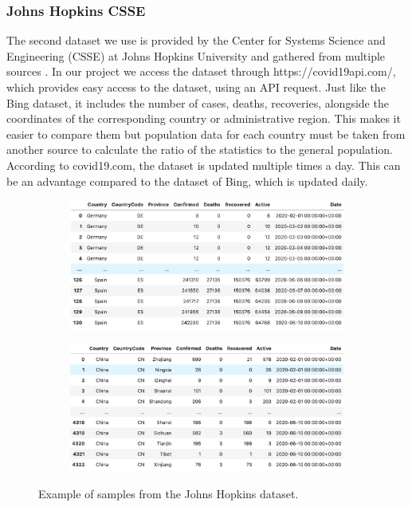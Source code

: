 \subsubsection{Johns Hopkins CSSE}
The second dataset we use is provided by the Center for Systems Science and Engineering (CSSE) at Johns Hopkins University and gathered from multiple sources \cite{JohnsHopkins}.
In our project we access the dataset through https://covid19api.com/, which provides easy access to the dataset, using an API request. Just like the Bing dataset, it includes the number of cases, deaths, recoveries, alongside the coordinates of the
corresponding country or administrative region. This makes it easier to compare them but population data for each country must be taken from another source to calculate the ratio of the statistics to the general population.
According to covid19.com, the dataset is updated multiple times a day. This can be an advantage compared to the dataset of Bing, which is updated daily.


\begin{figure}[h]
	\centering
	\begin{subfigure}[b]{0.47\linewidth}
		\includegraphics[width=\linewidth]{covid/countrys}
	\end{subfigure}
	\begin{subfigure}[b]{0.47\linewidth}
		\includegraphics[width=\linewidth]{covid/provinces}
	\end{subfigure}
	\caption{Example of samples from the Johns Hopkins dataset.}
\end{figure}

